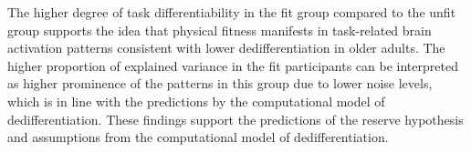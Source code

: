 \noindent The higher degree of task differentiability in the fit group compared to the unfit group supports the idea that physical fitness manifests in task-related brain activation patterns consistent with lower dedifferentiation in older adults. The higher proportion of explained variance in the fit participants can be interpreted as higher prominence of the patterns in this group due to lower noise levels, which is in line with the predictions by the computational model of dedifferentiation. These findings support the predictions of the reserve hypothesis and assumptions from the computational model of dedifferentiation.

